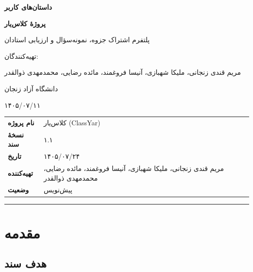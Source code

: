 \documentclass[12pt, a4paper]{article}
\begin{document}
\begin{titlepage}
\centering
\vspace*{3cm}
{\Huge\bfseries داستان‌های کاربر\par}
\vspace{0.5cm}
{\LARGE\bfseries پروژهٔ کلاس‌یار\par}
\vspace{0.5cm}
{\large پلتفرم اشتراک جزوه، نمونه‌سؤال و ارزیابی استادان\par}
\vspace{2cm}
{\large تهیه‌کنندگان:\par}
{\large مریم قندی زنجانی، ملیکا شهبازی، آنیسا فروغمند، مائده رضایی، محمدمهدی ذوالقدر\par}
\vspace{0.5cm}
{\large دانشگاه آزاد زنجان\par}
\vspace{1cm}
{\large ۱۴۰۵/۰۷/۱۱\par}
\end{titlepage}

\tableofcontents
\newpage

{\def\LTcaptype{none} %
\begin{longtable}[]{@{}
  >{\raggedright\arraybackslash}p{}
  >{\raggedright\arraybackslash}p{}@{}}
\toprule\noalign{}
\endhead
\bottomrule\noalign{}
\endlastfoot
\textbf{نام پروژه} & کلاس‌یار (ClassYar) \\
\textbf{نسخهٔ سند} & ۱.۱ \\
\textbf{تاریخ} & ۱۴۰۵/۰۷/۲۴ \\
\textbf{تهیه‌کننده} & مریم قندی زنجانی، ملیکا شهبازی، آنیسا فروغمند، مائده رضایی، محمدمهدی ذوالقدر \\
\textbf{وضعیت} & پیش‌نویس \\
\end{longtable}
}

\begin{center}\rule{0.5\linewidth}{0.5pt}\end{center}

\section{مقدمه}

\subsection{هدف سند}
\end{document}
